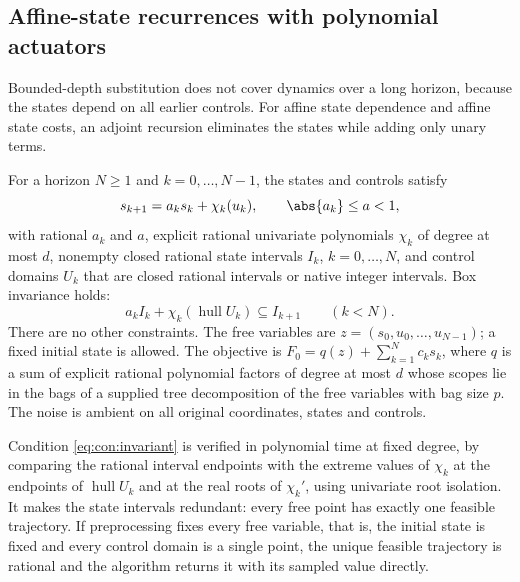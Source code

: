 \subsection{Affine-state recurrences with polynomial actuators}\label{sec:con:actuator}

Bounded-depth substitution does not cover dynamics over a long horizon,
because the states depend on all earlier controls. For affine state
dependence and affine state costs, an adjoint recursion eliminates the
states while adding only unary terms.

\begin{definition}\label{def:con:actuator}
For a horizon $N\ge1$ and $k=0,\dots,N-1$, the states and controls satisfy
\begin{equation}\label{eq:con:dyn}
 s_{k+1}=a_ks_k+\chi_k(u_k),\qquad\abs{a_k}\le a<1,
\end{equation}
with rational $a_k$ and $a$, explicit rational univariate polynomials $\chi_k$
of degree at most $d$, nonempty closed rational state intervals $I_k$,
$k=0,\dots,N$, and control domains $U_k$ that are closed rational intervals
or native integer intervals. Box invariance holds:
\begin{equation}\label{eq:con:invariant}
 a_kI_k+\chi_k(\operatorname{hull}U_k)\subseteq I_{k+1}\qquad(k<N).
\end{equation}
There are no other constraints. The free variables are
$z=(s_0,u_0,\dots,u_{N-1})$; a fixed initial state is allowed. The objective
is $F_0=q(z)+\sum_{k=1}^Nc_ks_k$, where $q$ is a sum of explicit rational
polynomial factors of degree at most $d$ whose scopes lie in the bags of a
supplied tree decomposition of the free variables with bag size $p$. The
noise is ambient on all original coordinates, states and controls.
\end{definition}

Condition \eqref{eq:con:invariant} is verified in polynomial time at fixed
degree, by comparing the rational interval endpoints with the extreme values
of $\chi_k$ at the endpoints of $\operatorname{hull}U_k$ and at the real roots
of $\chi_k'$, using univariate root isolation. It makes the state intervals
redundant: every free point has exactly one feasible trajectory. If
preprocessing fixes every free variable, that is, the initial state is
fixed and every control domain is a single point, the unique feasible
trajectory is rational and the algorithm returns it with its sampled value
directly.

